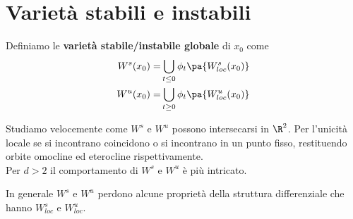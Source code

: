 \section{Variet\`a stabili e instabili}

\begin{definition}
Definiamo le \textbf{variet\`a stabile/instabile globale} di $x_0$ come
\begin{align*}
W^s(x_0)=&\bigcup_{t\leq0}\phi_t\pa{W^s_{loc}(x_0)}\\
W^u(x_0)=&\bigcup_{t\geq0}\phi_t\pa{W^u_{loc}(x_0)}
\end{align*}
\end{definition}
\begin{remark}
Studiamo velocemente come $W^s$ e $W^u$ possono intersecarsi in $\R^2$. Per l'unicit\`a locale se si incontrano coincidono o si incontrano in un punto fisso, restituendo orbite omocline ed eterocline rispettivamente.\\
Per $d>2$ il comportamento di $W^s$ e $W^u$ \`e pi\`u intricato.
\end{remark}
\begin{remark}
In generale $W^s$ e $W^u$ perdono alcune propriet\`a della struttura differenziale che hanno $W^s_{loc}$ e $W^u_{loc}$.
\end{remark}


